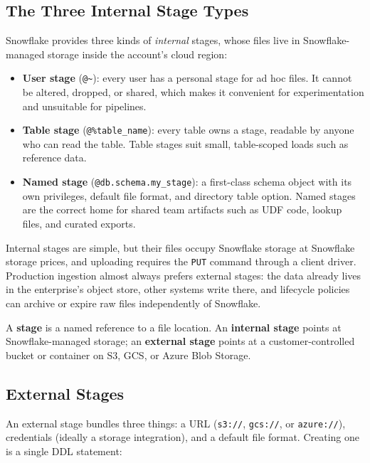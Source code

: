 \subsection{The Three Internal Stage Types}
Snowflake provides three kinds of \emph{internal} stages, whose files live in Snowflake-managed storage inside the account's cloud region:
\begin{itemize}
    \item \textbf{User stage} (\texttt{@\textasciitilde}): every user has a personal stage for ad hoc files. It cannot be altered, dropped, or shared, which makes it convenient for experimentation and unsuitable for pipelines.
    \item \textbf{Table stage} (\texttt{@\%table\_name}): every table owns a stage, readable by anyone who can read the table. Table stages suit small, table-scoped loads such as reference data.
    \item \textbf{Named stage} (\texttt{@db.schema.my\_stage}): a first-class schema object with its own privileges, default file format, and directory table option. Named stages are the correct home for shared team artifacts such as UDF code, lookup files, and curated exports.
\end{itemize}

Internal stages are simple, but their files occupy Snowflake storage at Snowflake storage prices, and uploading requires the \texttt{PUT} command through a client driver. Production ingestion almost always prefers external stages: the data already lives in the enterprise's object store, other systems write there, and lifecycle policies can archive or expire raw files independently of Snowflake.

\begin{definitionbox}
A \textbf{stage} is a named reference to a file location. An \textbf{internal stage} points at Snowflake-managed storage; an \textbf{external stage} points at a customer-controlled bucket or container on S3, GCS, or Azure Blob Storage.
\end{definitionbox}

\subsection{External Stages}
An external stage bundles three things: a URL (\texttt{s3://}, \texttt{gcs://}, or \texttt{azure://}), credentials (ideally a storage integration), and a default file format. Creating one is a single DDL statement:

